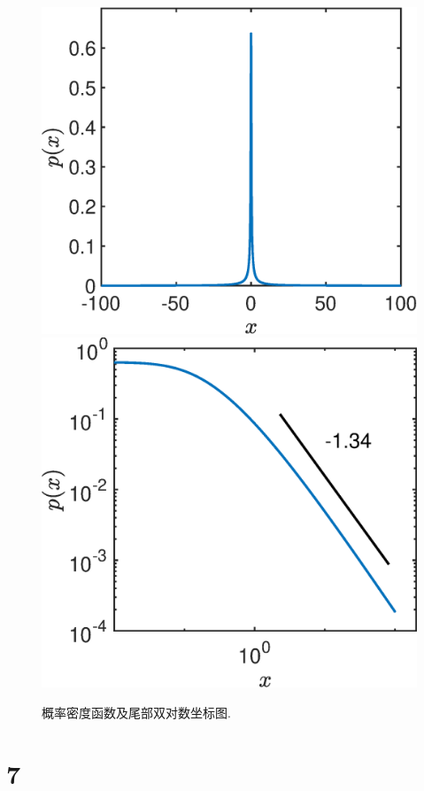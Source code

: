 \documentclass[12pt,a4]{ctexart}
\begin{document}
\begin{figure}[htp]
	\centering
	\includegraphics[scale=0.33]{6pdf.eps}
	\hspace{0.5in}
	\includegraphics[scale=0.33]{6log.eps}
	\caption{概率密度函数及尾部双对数坐标图.}
	\label{fig:6pdf}
\end{figure}


\section{7}
\end{document}
